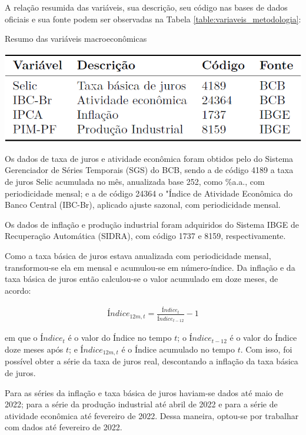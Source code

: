 A relação resumida das variáveis, sua descrição, seu código nas bases de dados oficiais e sua fonte podem ser observadas na Tabela \ref{table:variaveis_metodologia}:

\begin{table}[hbtp]
	\centering
	\caption{Resumo das variáveis macroeconômicas} \label{table:variaveis_metodologia}
	\includegraphics[scale = 0.50]{figuras/variaveis_metodologia.PNG}
\end{table}

Os dados de taxa de juros e atividade econômica foram obtidos pelo do Sistema Gerenciador de Séries Temporais (SGS) do BCB, sendo a de código 4189 a taxa de juros Selic acumulada no mês, anualizada base 252, como \%a.a., com periodicidade mensal; e a de código 24364 o "Índice de Atividade Econômica do Banco Central (IBC-Br), aplicado ajuste sazonal, com periodicidade mensal. 

Os dados de inflação e produção industrial foram adquiridos do Sistema IBGE de Recuperação Automática (SIDRA), com código 1737 e 8159, respectivamente.

Como a taxa básica de juros estava anualizada com periodicidade mensal, transformou-se ela em mensal e acumulou-se em número-índice. Da inflação e da taxa básica de juros então calculou-se o valor acumulado em doze meses, de acordo:

\begin{ceqn}
\begin{align} \label{}
\textit{Índice}_{12m, t} = \frac{\textit{Índice}_{t}}{\textit{Índice}_{t-12}} - 1 
\end{align}
\end{ceqn} em que o $\textit{Índice}_{t}$ é o valor do Índice no tempo $t$; o $\textit{Índice}_{t-12}$ é o valor do Índice doze meses após $t$; e $\textit{Índice}_{12m, t}$ é o Índice acumulado no tempo $t$. Com isso, foi possível obter a série da taxa de juros real, descontando a inflação da taxa básica de juros.

Para as séries da inflação e taxa básica de juros haviam-se dados até maio de 2022; para a série da produção industrial até abril de 2022 e para a série de atividade econômica até fevereiro de 2022. Dessa maneira, optou-se por trabalhar com dados até fevereiro de 2022.